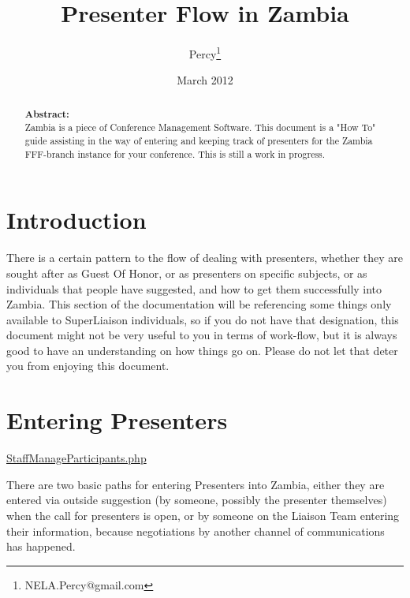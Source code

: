 \documentclass[captions=tablesignature]{scrartcl}
\author{Percy\thanks{NELA.Percy@gmail.com}}
\date{March 2012}
\title{Presenter Flow in Zambia}
\begin{document}
\maketitle
{}
\thispagestyle{fancy}
\renewcommand{\headrulewidth}{0pt}
\renewcommand{\footrulewidth}{0pt}
\lhead{}
\rhead{}
\chead{}
\lfoot{}
\cfoot{}
\rfoot{}
\begin{abstract}
\vspace{5cm}
{\LARGE{\textbf{Abstract:\\}}}
Zambia is a piece of Conference Management Software.  This document is a "How To" guide assisting in the way of entering and keeping track of presenters for the Zambia FFF-branch instance for your conference.  This is still a work in progress.
\end{abstract}
\newpage
\renewcommand{\headrulewidth}{1pt}
\renewcommand{\footrulewidth}{1pt}
\rfoot{\thepage}
\setcounter{tocdepth}{3}
\tableofcontents
\listoffigures
\listoftables
\newpage
{}
\section{Introduction}
\label{sec-1}

There is a certain pattern to the flow of dealing with presenters,
whether they are sought after as Guest Of Honor, or as presenters on
specific subjects, or as individuals that people have suggested, and
how to get them successfully into Zambia.  This section of the
documentation will be referencing some things only available to
SuperLiaison individuals, so if you do not have that designation,
this document might not be very useful to you in terms of work-flow,
but it is always good to have an understanding on how things go on.
Please do not let that deter you from enjoying this document.
\section{Entering Presenters}
\label{sec-2}
\href{../webpages/StaffManageParticipants.php}{StaffManageParticipants.php}

There are two basic paths for entering Presenters into Zambia,
either they are entered via outside suggestion (by someone, possibly
the presenter themselves) when the call for presenters is open, or
by someone on the Liaison Team entering their information, because
negotiations by another channel of communications has happened.
\end{document}
